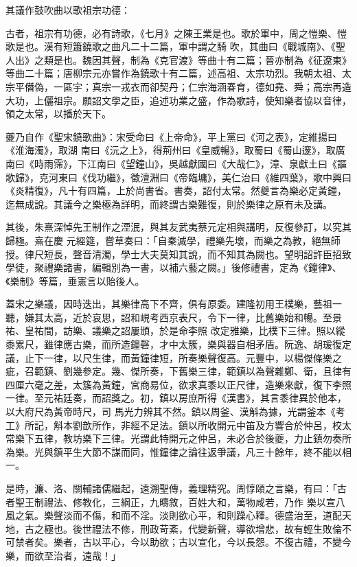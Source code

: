 \begin{pinyinscope}
 其議作鼓吹曲以歌祖宗功德：



 古者，祖宗有功德，必有詩歌，《七月》之陳王業是也。歌於軍中，周之愷樂、愷歌是也。漢有短簫鐃歌之曲凡二十二篇，軍中謂之騎
 吹，其曲曰《戰城南》、《聖人出》之類是也。魏因其聲，制為《克官渡》等曲十有二篇；晉亦制為《征遼東》等曲二十篇；唐柳宗元亦嘗作為鐃歌十有二篇，述高祖、太宗功烈。我朝太祖、太宗平僭偽，一區宇；真宗一戎衣而卻契丹；仁宗海涵春育，德如堯、舜；高宗再造大功，上儷祖宗。願詔文學之臣，追述功業之盛，作為歌詩，使知樂者協以音律，領之太常，以播於天下。



 夔乃自作《聖宋鐃歌曲》：宋受命曰《上帝命》，平上黨曰《河之表》，定維揚曰《淮海濁》，取湖
 南曰《沅之上》，得荊州曰《皇威暢》，取蜀曰《蜀山邃》，取廣南曰《時雨霈》，下江南曰《望鐘山》，吳越獻國曰《大哉仁》，漳、泉獻土曰《謳歌歸》，克河東曰《伐功繼》，徵澶淵曰《帝臨墉》，美仁治曰《維四葉》，歌中興曰《炎精復》，凡十有四篇，上於尚書省。書奏，詔付太常。然夔言為樂必定黃鐘，迄無成說。其議今之樂極為詳明，而終謂古樂難復，則於樂律之原有未及講。



 其後，朱熹深悼先王制作之湮泯，與其友武夷蔡元定相與講明，反復參訂，以究其歸極。熹在慶
 元經筵，嘗草奏曰：「自秦滅學，禮樂先壞，而樂之為教，絕無師授。律尺短長，聲音清濁，學士大夫莫知其說，而不知其為闕也。望明詔許臣招致學徒，聚禮樂諸書，編輯別為一書，以補六藝之闕。」後修禮書，定為《鐘律》、《樂制》等篇，垂憲言以貽後人。



 蓋宋之樂議，因時迭出，其樂律高下不齊，俱有原委。建隆初用王樸樂，藝祖一聽，嫌其太高，近於哀思，詔和峴考西京表尺，令下一律，比舊樂始和暢。至景祐、皇祐間，訪樂、議樂之詔屢頒，於是命李照
 改定雅樂，比樸下三律。照以縱黍累尺，雖律應古樂，而所造鐘磬，才中太簇，樂與器自相矛盾。阮逸、胡瑗復定議，止下一律，以尺生律，而黃鐘律短，所奏樂聲復高。元豐中，以楊傑條樂之疵，召範鎮、劉幾參定。幾、傑所奏，下舊樂三律，範鎮以為聲雜鄭、衛，且律有四厘六毫之差，太簇為黃鐘，宮商易位，欲求真黍以正尺律，造樂來獻，復下李照一律。至元祐廷奏，而詔獎之。初，鎮以房庶所得《漢書》，其言黍律異於他本，以大府尺為黃帝時尺，司
 馬光力辨其不然。鎮以周釜、漢斛為據，光謂釜本《考工》所記，斛本劉歆所作，非經不足法。鎮以所收開元中笛及方響合於仲呂，校太常樂下五律，教坊樂下三律。光謂此特開元之仲呂，未必合於後夔，力止鎮勿奏所為樂。光與鎮平生大節不謀而同，惟鐘律之論往返爭議，凡三十餘年，終不能以相一。



 是時，濂、洛、關輔諸儒繼起，遠溯聖傳，義理精究。周惇頤之言樂，有曰：「古者聖王制禮法、修教化，三綱正，九疇敘，百姓大和，萬物咸若，乃作
 樂以宣八風之氣。樂聲淡而不傷，和而不淫。淡則欲心平，和則躁心釋。德盛治至，道配天地，古之極也。後世禮法不修，刑政苛紊，代變新聲，導欲增悲，故有輕生敗倫不可禁者矣。樂者，古以平心，今以助欲；古以宣化，今以長怨。不復古禮，不變今樂，而欲至治者，遠哉！」




\end{pinyinscope}
